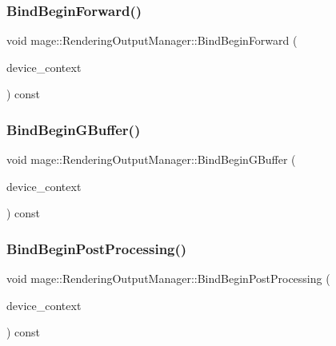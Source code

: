 \subsubsection{\texorpdfstring{Bind\+Begin\+Forward()}{BindBeginForward()}}
{\footnotesize\ttfamily void mage\+::\+Rendering\+Output\+Manager\+::\+Bind\+Begin\+Forward (\begin{DoxyParamCaption}\item[{I\+D3\+D11\+Device\+Context4 $\ast$}]{device\+\_\+context }\end{DoxyParamCaption}) const\hspace{0.3cm}{\ttfamily [noexcept]}}

\hypertarget{classmage_1_1_rendering_output_manager_aaf66f4a405ed9e8ab54474620bc9aef9}{}\label{classmage_1_1_rendering_output_manager_aaf66f4a405ed9e8ab54474620bc9aef9} 
\subsubsection{\texorpdfstring{Bind\+Begin\+G\+Buffer()}{BindBeginGBuffer()}}
{\footnotesize\ttfamily void mage\+::\+Rendering\+Output\+Manager\+::\+Bind\+Begin\+G\+Buffer (\begin{DoxyParamCaption}\item[{I\+D3\+D11\+Device\+Context4 $\ast$}]{device\+\_\+context }\end{DoxyParamCaption}) const\hspace{0.3cm}{\ttfamily [noexcept]}}

\hypertarget{classmage_1_1_rendering_output_manager_acf03c6d085d822713e52dec49ef99595}{}\label{classmage_1_1_rendering_output_manager_acf03c6d085d822713e52dec49ef99595} 
\subsubsection{\texorpdfstring{Bind\+Begin\+Post\+Processing()}{BindBeginPostProcessing()}}
{\footnotesize\ttfamily void mage\+::\+Rendering\+Output\+Manager\+::\+Bind\+Begin\+Post\+Processing (\begin{DoxyParamCaption}\item[{I\+D3\+D11\+Device\+Context4 $\ast$}]{device\+\_\+context }\end{DoxyParamCaption}) const\hspace{0.3cm}{\ttfamily [noexcept]}}

